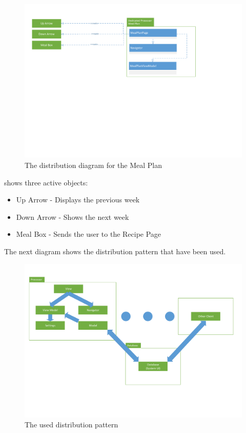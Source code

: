 \begin{figure}[H]
\includegraphics[width=\linewidth]{Grafik/FoodPlanner/DistributionMealPlan}
\centering
\caption{The distribution diagram for the Meal Plan}
\label{MPD}
\end{figure}

 shows three active objects:
\begin{itemize}
\item Up Arrow 
- Displays the previous week
\item Down Arrow 
- Shows the next week
\item Meal Box 
- Sends the user to the Recipe Page
\end{itemize}

The next diagram shows the distribution pattern that have been used.

\begin{figure}[H]
\includegraphics[width=\linewidth]{Grafik/FoodPlanner/FordelingsDiagram}
\centering
\caption{The used distribution pattern}
\label{DP}
\end{figure}

